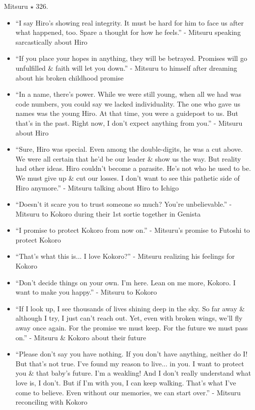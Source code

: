 \documentclass{article}
\begin{document}
\begin{enumerate}
\begin{itemize}
    \end{itemize}
    {\sc Mitsuru $\star$ 326.}
    \begin{itemize}
    	\item ``I say Hiro's showing real integrity. It must be hard for him to face us after what happened, too. Spare a thought for how he feels.'' - Mitsuru speaking sarcastically about Hiro
    	\item ``If you place your hopes in anything, they will be betrayed. Promises will go unfulfilled \& faith will let you down.'' - Mitsuru to himself after dreaming about his broken childhood promise
    	\item ``In a name, there's power. While we were still young, when all we had was code numbers, you could say we lacked individuality. The one who gave us names was the young Hiro. At that time, you were a guidepost to us. But that's in the past. Right now, I don't expect anything from you.'' - Mitsuru about Hiro
    	\item ``Sure, Hiro was special. Even among the double-digits, he was a cut above. We were all certain that he'd be our leader \& show us the way. But reality had other ideas. Hiro couldn't become a parasite. He's not who he used to be. We must give up \& cut our losses. I don't want to see this pathetic side of Hiro anymore.'' - Mitsuru talking about Hiro to Ichigo
    	\item ``Doesn't it scare you to trust someone so much? You're unbelievable.'' - Mitsuru to Kokoro during their 1st sortie together in Genista
    	\item ``I promise to protect Kokoro from now on.'' - Mitsuru's promise to Futoshi to protect Kokoro
    	\item ``That's what this is... I love Kokoro?'' - Mitsuru realizing his feelings for Kokoro
    	\item ``Don't decide things on your own. I'm here. Lean on me more, Kokoro. I want to make you happy.'' - Mitsuru to Kokoro
    	\item ``If I look up, I see thousands of lives shining deep in the sky. So far away \& although I try, I just can't reach out. Yet, even with broken wings, we'll fly away once again. For the promise we must keep. For the future we must pass on.'' - Mitsuru \& Kokoro about their future
    	\item ``Please don't say you have nothing. If you don't have anything, neither do I! But that's not true. I've found my reason to live... in you. I want to protect you \& that baby's future. I'm a weakling! And I don't really understand what love is, I don't. But if I'm with you, I can keep walking. That's what I've come to believe. Even without our memories, we can start over.'' - Mitsuru reconciling with Kokoro

\end{itemize}
\end{enumerate}
\end{document}
